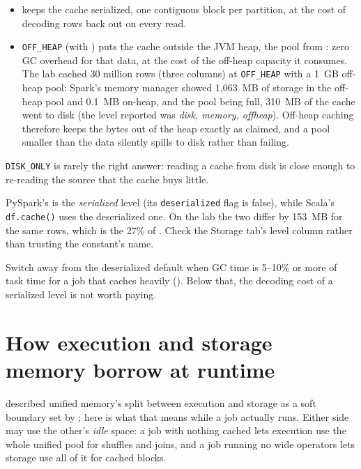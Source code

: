 \begin{itemize}
  \item {} keeps the cache serialized, one contiguous
        block per partition, at the cost of decoding rows back out on every read.
  \item \texttt{OFF\_HEAP} (with ) puts the
        cache outside the JVM heap, the pool from : zero GC
        overhead for that data, at the cost of the off-heap capacity it consumes.
        The lab cached 30 million rows (three columns) at \texttt{OFF\_HEAP} with a 1~GB
off-heap pool: Spark's memory manager showed 1,063~MB of storage in the off-heap pool and
0.1~MB on-heap, and the pool being full, 310~MB of the cache went to disk (the level
reported was \emph{disk, memory, offheap}). Off-heap caching therefore keeps the bytes
out of the heap exactly as claimed, and a pool smaller than the data silently spills
to disk rather than failing.
\end{itemize}

\texttt{DISK\_ONLY} is rarely the right answer: reading a cache from disk is close
enough to re-reading the source that the cache buys little.

\begin{warning}
PySpark's  is the \emph{serialized} level
(its \texttt{deserialized} flag is false), while Scala's \texttt{df.cache()} uses
the deserialized one. On the lab the two differ by 153~MB for the same rows,
which is the 27\% of . Check the Storage tab's
level column rather than trusting the constant's name.
\end{warning}

Switch away from the deserialized default when GC time is 5--10\% or more of
task time for a job that caches heavily (). Below that,
the decoding cost of a serialized level is not worth paying.

\section{How execution and storage memory borrow at runtime}
\label{sec:caching-borrowing}

 described unified memory's split between execution and
storage as a soft boundary set by ; here is
what that means while a job actually runs. Either side may use the other's
\emph{idle} space: a job with nothing cached lets execution use the whole unified
pool for shuffles and joins, and a job running no wide operators lets storage use
all of it for cached blocks.

